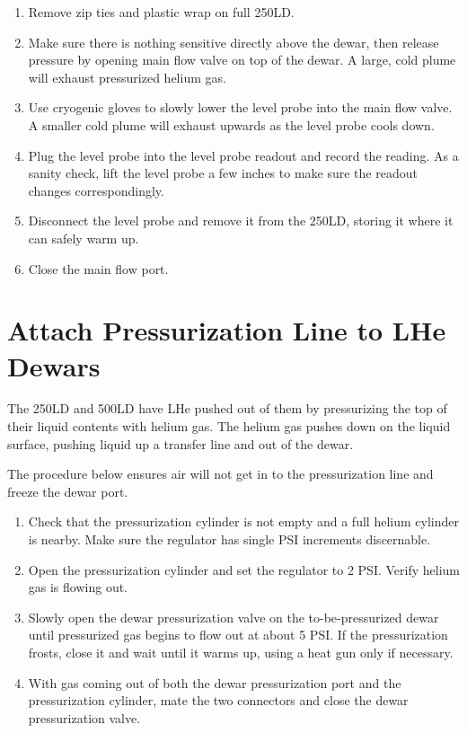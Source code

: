 \begin{enumerate}
 \item Remove zip ties and plastic wrap on full 250LD.
 \item Make sure there is nothing sensitive directly above the dewar, then release pressure by opening main flow valve on top of the dewar. A large, cold plume will exhaust pressurized helium gas.
 \item Use cryogenic gloves to slowly lower the level probe into the main flow valve. A smaller cold plume will exhaust upwards as the level probe cools down.
 \item Plug the level probe into the level probe readout and record the reading. As a sanity check, lift the level probe a few inches to make sure the readout changes correspondingly.
 \item Disconnect the level probe and remove it from the 250LD, storing it where it can safely warm up.
 \item Close the main flow port.
\end{enumerate}

\section{Attach Pressurization Line to LHe Dewars}
\label{procedure:attach-pressurization-line}

The 250LD and 500LD have LHe pushed out of them by pressurizing the top of their liquid contents with helium gas.  The helium gas pushes down on the liquid surface, pushing liquid up a transfer line and out of the dewar.

The procedure below ensures air will not get in to the pressurization line and freeze the dewar port.

\begin{enumerate}
 \item Check that the pressurization cylinder is not empty and a full helium cylinder is nearby.  Make sure the regulator has single PSI increments discernable.
 \item Open the pressurization cylinder and set the regulator to 2 PSI.  Verify helium gas is flowing out.
 \item Slowly open the dewar pressurization valve on the to-be-pressurized dewar until pressurized gas begins to flow out at about 5 PSI.  If the pressurization frosts, close it and wait until it warms up, using a heat gun only if  necessary.
 \item With gas coming out of both the dewar pressurization port and the pressurization cylinder, mate the two connectors and close the dewar pressurization valve.
\end{enumerate}


